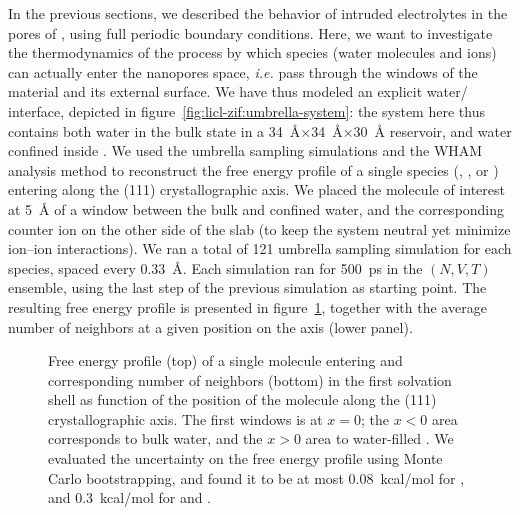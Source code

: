 \documentclass[thesis]{subfiles}
\begin{document}
In the previous sections, we described the behavior of intruded electrolytes in
the pores of , using full periodic boundary conditions. Here, we want to
investigate the thermodynamics of the process by which species (water molecules
and ions) can actually enter the nanopores space, \emph{i.e.} pass through the
windows of the material and its external surface. We have thus modeled an
explicit water/ interface, depicted in figure~\ref{fig:licl-zif:umbrella-system}:
the system here thus contains both water in the bulk state in a
\SI{34}{\angstrom}$\times$\SI{34}{\angstrom}$\times$\SI{30}{\angstrom}
reservoir, and water confined inside . We used the umbrella sampling
simulations and the WHAM analysis method\cite{WHAM} to reconstruct the free
energy profile of a single species (, , or ) entering
 along the (111) crystallographic axis. We placed the molecule of interest
at \SI{5}{\angstrom} of a window between the bulk and confined water, and the
corresponding counter ion on the other side of the  slab (to keep the
system neutral yet minimize ion--ion interactions). We ran a total of 121
umbrella sampling simulation for each species, spaced every
\SI{0.33}{\angstrom}. Each simulation ran for \SI{500}{ps} in the $(N, V, T)$
ensemble, using the last step of the previous simulation as starting point. The
resulting free energy profile is presented in figure~\ref{fig:licl-zif:free}, together
with the average number of neighbors at a given position on the axis (lower
panel).

\begin{figure}[ht]
    \centering
    
    \caption{Free energy profile (top) of a single molecule entering  and
    corresponding number of neighbors (bottom) in the first solvation shell as
    function of the position of the molecule along the (111) crystallographic
    axis. The first  windows is at $x=0$; the $x<0$ area corresponds to
    bulk water, and the $x>0$ area to water-filled . We evaluated the
    uncertainty on the free energy profile using Monte Carlo
    bootstrapping\cite{WHAM}, and found it to be at most \SI{0.08}{kcal/mol} for
    , and \SI{0.3}{kcal/mol} for  and .}
    \label{fig:licl-zif:free}
\end{figure}
\end{document}
